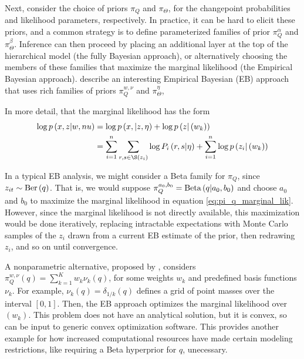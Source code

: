 Next, consider the choice of priors $\pi_{Q}$ and $\pi_{\Theta}$, for the
changepoint probabilities and likelihood parameters, respectively. In practice,
it can be hard to elicit these priors, and a common strategy is to define
parameterized families of prior $\pi_{Q}^{\alpha}$ and $\pi_{\Theta}^{\beta}$.
Inference can then proceed by placing an additional layer at the top of the
hierarchical model (the fully Bayesian approach), or alternatively choosing the
members of these families that maximize the marginal likelihood (the Empirical
Bayesian approach). \cite{fan2015empirical} describe an interesting Empirical
Bayesian (EB) approach that uses rich families of priors $\pi_{Q}^{w, \nu}$ and
$\pi_{\Theta}^{\eta}$,

In more detail, that the marginal likelihood has the form
\begin{align}
 \label{eq:pi_q_marginal_lik}
 \log p\left(x, z \vert w, nu\right) &= \log p\left(x, \vert z, \eta\right) + \log p\left(z \vert \left(w_k\right)\right) \\
 &= \sum_{i = 1}^{n} \sum_{r, s \in \S\left(z_{i}\right)} \log P_{i}\left(r, s \vert \eta \right) + \sum_{i = 1}^{n} \log p\left(z_{i} \vert \left(w_{k}\right)\right)
\end{align}

In a typical EB analysis, we might consider a Beta family for $\pi_{Q}$, since
$z_{it} \sim \textnormal{Ber}\left(q\right)$. That is, we would suppose $\pi_{Q}^{a_0, b_0}
= \textnormal{Beta}\left(q \vert a_{0}, b_{0}\right)$ and choose $a_{0}$ and $b_0$ to
maximize the marginal likelihood in equation \ref{eq:pi_q_marginal_lik}.
However, since the marginal likelihood is not directly available, this
maximization would be done iteratively, replacing intractable expectations with
Monte Carlo samples of the $z_i$ drawn from a current EB estimate of the prior,
then redrawing $z_i$, and so on until convergence.

A nonparametric alternative, proposed by \citep{fan2015empirical}, considers
$\pi_{Q}^{w, \nu}\left(q\right) = \sum_{k = 1}^{K} w_{k} \nu_{k}\left(q\right)$,
for some weights $w_{k}$ and predefined basis functions $\nu_{k}$. For example,
$\nu_{k}\left(q\right) = \delta_{1 / k}\left(q\right)$ defines a grid of point
masses over the interval $\left[0, 1\right]$. Then, the EB approach optimizes
the marginal likelihood over $\left(w_k\right)$. This problem does not have an
analytical solution, but it is convex, so can be input to generic convex
optimization software. This provides another example for how increased
computational resources have made certain modeling restrictions, like requiring
a Beta hyperprior for $q$, unecessary.

